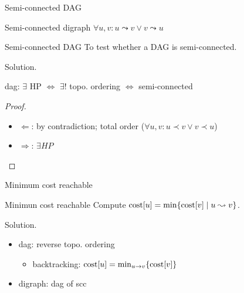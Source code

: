 \begin{frame}{Semi-connected DAG}
  \begin{definition}{Semi-connected digraph}
    $\forall u,v: u \leadsto v \lor v \leadsto u$
  \end{definition}

  \begin{exampleblock}{Semi-connected DAG }
    To test whether a DAG is semi-connected.
  \end{exampleblock}

  \begin{block}{Solution.}
    \begin{center}
      dag: $\exists$ HP $\iff$ $\exists!$ topo. ordering $\iff$ semi-connected
    \end{center}

    \begin{proof}
      \begin{itemize}
	\item $\Leftarrow$: by contradiction; total order ($\forall u,v: u \prec v \lor v \prec u$)
	\item $\Rightarrow$: $\exists HP$
      \end{itemize}
    \end{proof}
  \end{block}
\end{frame}
\begin{frame}{Minimum cost reachable}
  \begin{exampleblock}{Minimun cost reachable }
    Compute $\text{cost}[u] = \min \{\text{cost}[v] \mid u \leadsto v\}$.
  \end{exampleblock}

  \begin{block}{Solution.}
    \begin{itemize}
      \item dag: reverse topo. ordering
	\begin{itemize}
	  \item backtracking: $\text{cost}[u] = \min_{u \to v} \{\text{cost}[v]\}$
	\end{itemize}
      \item digraph: dag of scc
    \end{itemize}
  \end{block}
\end{frame}
